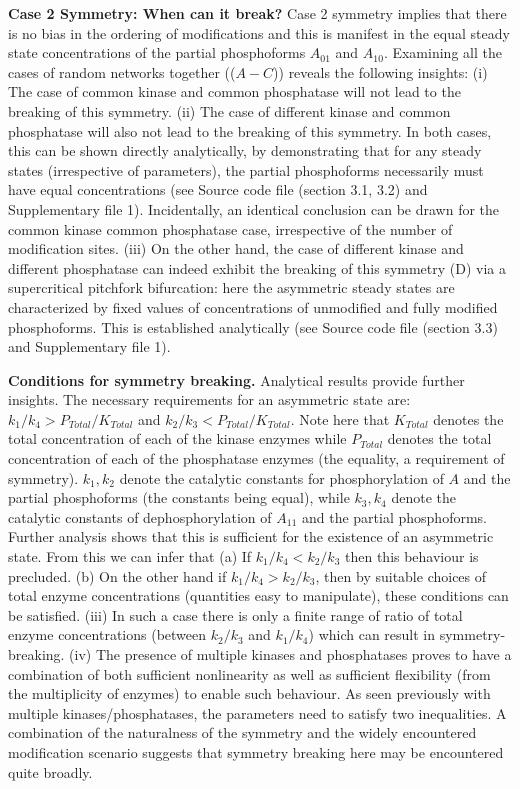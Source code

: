 \documentclass[9pt,lineno]{elife}
\begin{document}
{\bf Case 2 Symmetry: When can it break?} Case 2 symmetry implies that there is no bias in the ordering of modifications  and this is manifest in the equal steady state concentrations of the partial phosphoforms $A_{01}$ and $A_{10}$. Examining all the cases of random networks together (($A-C$)) reveals the following insights: (i) The case of common kinase and common phosphatase will not lead to the breaking of this  symmetry. (ii) The case of different kinase and common phosphatase  will also not lead to the breaking of this symmetry. In both cases, this can be shown directly analytically, by demonstrating that for any steady states (irrespective of parameters), the partial phosphoforms necessarily must have equal concentrations (see Source code file (section 3.1, 3.2) and Supplementary file 1).
Incidentally, an identical conclusion can be drawn for the common kinase common phosphatase case, irrespective of the number of modification sites.
(iii) On the other hand, the case of different kinase and different phosphatase can indeed exhibit the breaking of this symmetry (D) via a supercritical pitchfork bifurcation: here the asymmetric steady states are characterized by fixed values of concentrations of  unmodified and fully modified phosphoforms. This is established analytically (see Source code file (section 3.3) and Supplementary file 1).

{\bf Conditions for symmetry breaking.} Analytical results provide further insights. The necessary requirements for an asymmetric state are:
$k_1/k_4 > P_{Total}/K_{Total}$ and $k_2/k_3 <P_{Total}/K_{Total}$. Note here that $K_{Total}$  denotes the total concentration of each of the kinase enzymes while $P_{Total}$ denotes the total concentration of each of the phosphatase enzymes (the equality, a requirement of symmetry).
$k_1,k_2$ denote the catalytic constants for phosphorylation
of $A$ and the partial phosphoforms (the constants being equal),
while $k_3,k_4$ denote the catalytic constants of dephosphorylation of $A_{11}$ and the partial phosphoforms.
Further analysis shows that this is sufficient for the existence of an asymmetric state. From this we can infer that (a) If $k_1/k_4 <k_2/k_3$ then this behaviour is precluded. (b) On the other hand if $k_1/k_4 >k_2/k_3$, then by suitable choices of total enzyme concentrations (quantities easy to manipulate), these conditions can be satisfied. (iii) In such a case there is only a finite range of ratio of total enzyme concentrations (between $k_2/k_3$ and $k_1/k_4$) which can result in symmetry-breaking. (iv) The presence of multiple kinases and phosphatases proves to have a combination of both sufficient nonlinearity as well as sufficient flexibility (from the multiplicity of enzymes) to enable such behaviour. As seen previously with multiple kinases/phosphatases, the parameters need to satisfy two inequalities.
A combination of the naturalness of the symmetry and the widely encountered modification scenario suggests that symmetry breaking here may be encountered quite broadly. 
\end{document}
